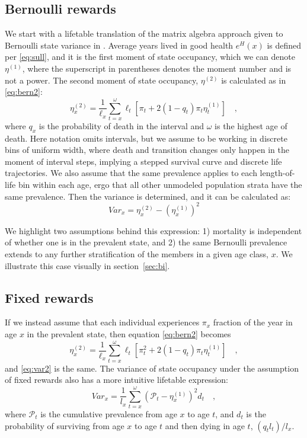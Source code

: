 \documentclass{bmcart}
\begin{document}
\subsection{Bernoulli rewards}
We start with a lifetable translation of the matrix algebra approach given to Bernoulli state variance in \cite{caswell2018matrix}. Average years lived in good health $e^H(x)$ is defined per \eqref{eq:sull}, and it is the first moment of state occupancy, which we can denote $\eta^{(1)}$, where the superscript in parentheses denotes the moment number and is not a power. The second moment of state occupancy, $\eta^{(2)}$ is calculated as in \eqref{eq:bern2}:
\begin{equation}
\label{eq:bern2}
\eta^{(2)}_x = \frac{1}{\ell_x} \sum_{t=x}^\omega \ell_t\left[\pi_t + 2(1-q_t)\pi_t\eta^{(1)}_t\right] \quad \mathrm{,}
\end{equation}
where $q_x$ is the probability of death in the interval and $\omega$ is the highest age of death. Here notation omits intervals, but we assume to be working in discrete bins of uniform width, where death and transition changes only happen in the moment of interval steps, implying a stepped survival curve and discrete life trajectories. We also assume that the same prevalence applies to each length-of-life bin within each age, ergo that all other unmodeled population strata have the same prevalence. Then the variance is determined, and it can be calculated as:
\begin{equation}
\label{eq:var2}
Var_x = \eta^{(2)}_x - (\eta^{(1)}_x)^2
\end{equation}

We highlight two assumptions behind this expression: 1) mortality is independent of whether one is in the prevalent state, and 2) the same Bernoulli prevalence extends to any further stratification of the members in a given age class, $x$. We illustrate this case visually in section~\ref{sec:bi}.

\subsection{Fixed rewards}
If we instead assume that each individual experiences $\pi_x$ fraction of the year in age $x$ in the prevalent state, then equation \eqref{eq:bern2} becomes
\begin{equation}
\eta^{(2)}_x = \frac{1}{\ell_x} \sum_{t=x}^\omega \ell_t\left[\pi_t^2 + 2(1-q_t)\pi_t\eta^{(1)}_t\right] \quad \mathrm{,}
\end{equation}
and \eqref{eq:var2} is the same. The variance of state occupancy under the assumption of fixed rewards also has a more intuitive lifetable expression:
\begin{equation}
\label{eq:varfixed2}
Var_x = \frac{1}{l_x}\sum_{t=x}^\omega (\mathcal{P}_t - \eta^{(1)}_x)^2 d_t \quad\mathrm{,}
\end{equation}
where $\mathcal{P}_t$ is the cumulative prevalence from age $x$ to age $t$, and $d_t$ is the probability of surviving from age $x$ to age $t$ and then dying in age $t$, $(q_t l_t)/l_x$. 
\end{document}
